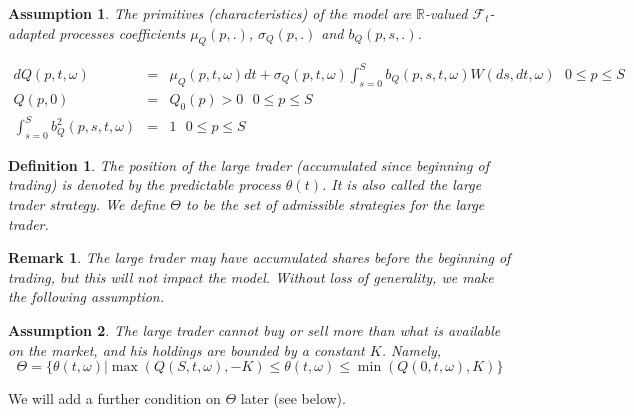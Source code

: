\documentclass{article}
\newtheorem{definition}{Definition}
\newtheorem{remark}{Remark}
\newtheorem{assumption}{Assumption}
\begin{document}

\begin{assumption}
The primitives (characteristics) of the model are $\mathbb{R}$-valued $%
\mathcal{F}_{t}$-adapted processes coefficients $\mu _{Q}(p,.)$, $\sigma
_{Q}(p,.)$ and $b_{Q}(p,s,.)$.

\begin{eqnarray}
dQ(p,t,\omega ) &=&\mu _{Q}(p,t,\omega )dt+\sigma _{Q}(p,t,\omega
)\int_{s=0}^{S}b_{Q}(p,s,t,\omega )W(ds,dt,\omega )\text{ \ \ \ }0\leq p\leq
S  \label{GenMod1} \\
Q(p,0) &=&Q_{0}(p)>0\text{ \ \ \ \ \ \ \ \ }0\leq p\leq S  \label{GenMod2} \\
\int_{s=0}^{S}b_{Q}^{2}(p,s,t,\omega ) &=&1\text{ \ \ \ \ \ \ \ \ }0\leq
p\leq S  \label{GenMod3}
\end{eqnarray}
\end{assumption}



\begin{definition}
The position of the large trader (accumulated since beginning of trading) is
denoted by the predictable process $\theta (t)$. It is also called the
\textit{large trader strategy}. We define $\Theta $ to be the set of
admissible strategies for the large trader.
\end{definition}



\begin{remark}
The large trader may have accumulated shares before the beginning of
trading, but this will not impact the model. Without loss of generality, we
make the following assumption.
\end{remark}



\begin{assumption}
The large trader cannot buy or sell more than what is available on the
market, and his holdings are bounded by a constant $K$. Namely,%
\begin{equation*}
\Theta =\{\theta (t,\omega )|\max (Q(S,t,\omega ),-K)\leq \theta (t,\omega
)\leq \min (Q(0,t,\omega ),K)\}
\end{equation*}
\end{assumption}

We will add a further condition on $\Theta $ later (see below).
\end{document}
